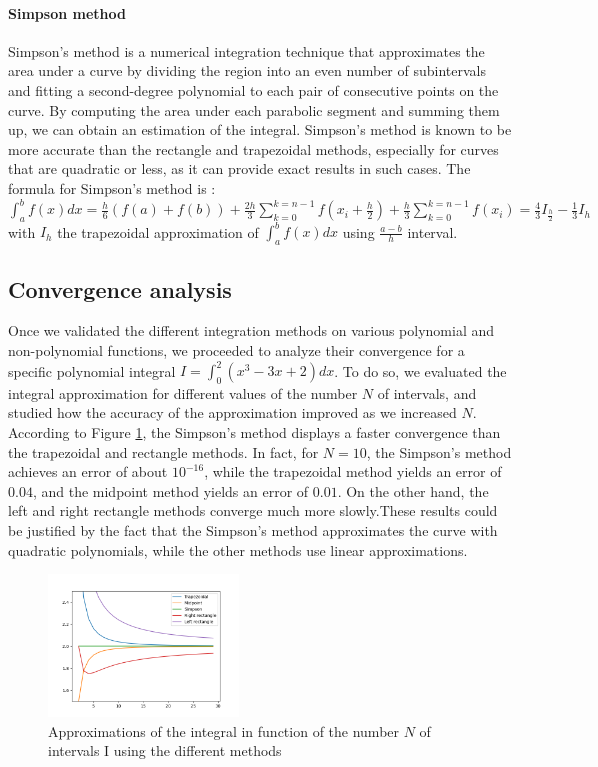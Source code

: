 \paragraph{Simpson method}
Simpson's method is a numerical integration technique that approximates the area under a curve by dividing the region into an even number of subintervals and fitting a second-degree polynomial to each pair of consecutive points on the curve. By computing the area under each parabolic segment and summing them up, we can obtain an estimation of the integral. Simpson's method is known to be more accurate than the rectangle and trapezoidal methods, especially for curves that are quadratic or less, as it can provide exact results in such cases. The formula for Simpson's method is : \\
$\int_{a}^{b}f(x)dx = \frac{h}{6}(f(a)+f(b)) +\frac{2h}{3}\sum_{k=0}^{k=n-1}f(x_{i} +\frac{h}{2})  + \frac{h}{3}\sum_{k=0}^{k=n-1} f(x_{i}) = \frac{4}{3}I_{\frac{h}{2}} - \frac{1}{3}I_{h} $ \\
with $I_{h}$ the trapezoidal approximation of $\int_{a}^{b}f(x)dx $ using $\frac{a-b}{h}$ interval.

\subsection{Convergence analysis}
\label{section}
Once we validated the different integration methods on various polynomial and non-polynomial functions, we proceeded to analyze their convergence for a specific polynomial integral $ I = \int_{0}^{2}(x^{3} -3x +2)dx$. To do so, we evaluated the integral approximation for different values of the number $N$ of intervals, and studied how the accuracy of the approximation improved as we increased $N$. \\
According to Figure \ref{fig:speed}, the Simpson's method displays a faster convergence than the trapezoidal and rectangle methods. In fact, for $N=10$, the Simpson's method achieves an error of about $10^{-16}$, while the trapezoidal method yields an error of $0.04$, and the midpoint method yields an error of $0.01$. On the other hand, the left and right rectangle methods converge much more slowly.These results could be justified by the fact that the Simpson's method approximates the curve with quadratic polynomials, while the other methods use linear approximations.\\
\begin{figure}[h]
  \centering
  \includegraphics[width=0.45\textwidth]{img/speed_convergence.png}
  \caption{Approximations of the integral in function of the number $N$ of intervals I using the different methods}
  \label{fig:speed}
\end{figure}

